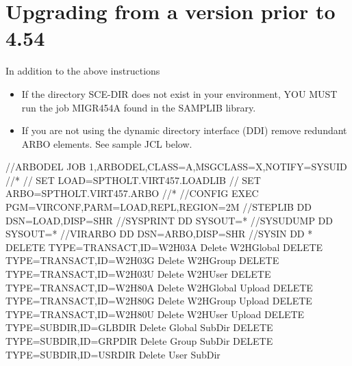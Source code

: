 \documentclass[letterpaper,10pt,english]{sphinxmanual}
\begin{document}

\section{Upgrading from a version prior to 4.54}
\label{\detokenize{Migration_Guide:index-4}}\label{\detokenize{Migration_Guide:upgrading-from-a-version-prior-to-4-54}}
In addition to the above instructions
\begin{itemize}
\item {} 
If the directory SCE-DIR does not exist in your environment, YOU MUST run the job MIGR454A found in the SAMPLIB library.

\item {} 
If you are not using the dynamic directory interface (DDI) remove redundant ARBO elements. See sample JCL below.

\end{itemize}

\begin{sphinxVerbatim}[commandchars=\\\{\}]
//\PYGZdl{}ARBODEL JOB 1,ARBODEL,CLASS=A,MSGCLASS=X,NOTIFY=\PYGZam{}SYSUID
//*
// SET LOAD=SPTHOLT.VIRT457.LOADLIB
// SET ARBO=SPTHOLT.VIRT457.ARBO
//*
//CONFIG  EXEC PGM=VIRCONF,PARM=\PYGZsq{}LOAD,REPL\PYGZsq{},REGION=2M
//STEPLIB  DD  DSN=\PYGZam{}LOAD,DISP=SHR
//SYSPRINT DD  SYSOUT=*
//SYSUDUMP DD  SYSOUT=*
//VIRARBO  DD  DSN=\PYGZam{}ARBO,DISP=SHR
//SYSIN      DD *
DELETE TYPE=TRANSACT,ID=W2H\PYGZhy{}03A    Delete W2H\PYGZhy{}Global
DELETE TYPE=TRANSACT,ID=W2H\PYGZhy{}03G    Delete W2H\PYGZhy{}Group
DELETE TYPE=TRANSACT,ID=W2H\PYGZhy{}03U    Delete W2H\PYGZhy{}User
DELETE TYPE=TRANSACT,ID=W2H\PYGZhy{}80A    Delete W2H\PYGZhy{}Global Upload
DELETE TYPE=TRANSACT,ID=W2H\PYGZhy{}80G    Delete W2H\PYGZhy{}Group Upload
DELETE TYPE=TRANSACT,ID=W2H\PYGZhy{}80U    Delete W2H\PYGZhy{}User Upload
DELETE TYPE=SUBDIR,ID=GLB\PYGZhy{}DIR      Delete Global Sub\PYGZhy{}Dir
DELETE TYPE=SUBDIR,ID=GRP\PYGZhy{}DIR      Delete Group Sub\PYGZhy{}Dir
DELETE TYPE=SUBDIR,ID=USR\PYGZhy{}DIR      Delete User Sub\PYGZhy{}Dir
\end{sphinxVerbatim}

\end{document}
